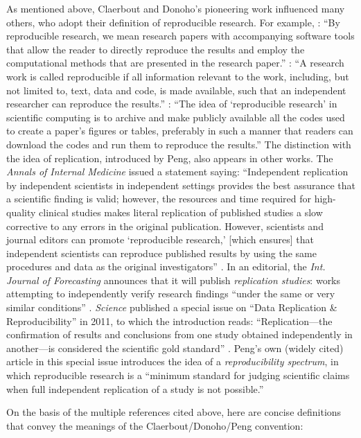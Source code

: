 \documentclass{statement}
\begin{document}
As mentioned above, Claerbout and Donoho's pioneering work influenced many others, who adopt their definition of reproducible research. 
For example, \cite{gentlemanETal2007}: ``By reproducible research, we mean research papers with accompanying software tools that allow the reader to directly reproduce the results and employ the computational methods that are presented in the research paper.''
\cite{vandewalleETal2009}: ``A research work is called reproducible if all information relevant to the work, including, but not limited to, text, data and code, is made available, such that an independent researcher can reproduce the results.''
\cite{leveque2009}: ``The idea of `reproducible research' in scientific computing is to archive and make publicly available all the codes used to create a paper's figures or tables, preferably in such a manner that readers can download the codes and run them to reproduce the results.''
The distinction with the idea of replication, introduced by Peng, also appears in other works. 
The \emph{Annals of Internal Medicine} issued a statement saying: ``Independent replication by independent scientists in independent settings provides the best assurance that a scientific finding is valid; however, the resources and time required for high-quality clinical studies makes literal replication of published studies a slow corrective to any errors in the original publication. However, scientists and journal editors can promote `reproducible research,' [which ensures] that independent scientists can reproduce published results by using the same procedures and data as the original investigators'' \cite[]{laineETal2007}. 
In an editorial, the \emph{Int. Journal of Forecasting} announces that it will publish \emph{replication studies}: works attempting to independently verify research findings ``under the same or very similar conditions'' \cite[]{hyndman2010}. 
\emph{Science} published a special issue on ``Data Replication \& Reproducibility'' in 2011, to which the introduction reads: ``Replication---the confirmation of results and conclusions from one study obtained independently in another---is considered the scientific gold standard'' \cite[]{jasnyETal2011}.
Peng's own (widely cited) article in this special issue introduces the idea of a \emph{reproducibility spectrum}, in which reproducible research is a ``minimum standard for judging scientific claims when full independent replication of a study is not possible.''

On the basis of the multiple references cited above, here are concise definitions that convey the meanings of the Claerbout/Donoho/Peng convention:
\end{document}
